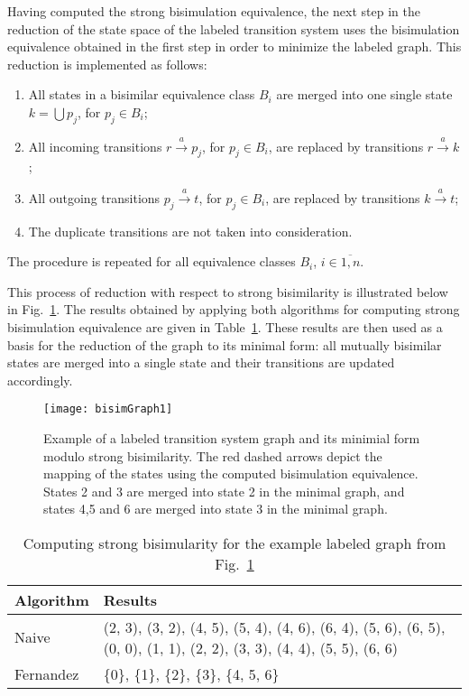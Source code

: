 Having computed the strong bisimulation equivalence, the next step in the reduction of the state space of the labeled transition system uses the bisimulation equivalence obtained in the first step in order to minimize the labeled graph. This reduction is implemented as follows:
\begin{enumerate}
	\item All states in a bisimilar equivalence class $B_{i}$ are merged into one single state $k=\bigcup p_{j}$, for $p_{j}\in B_{i}$;
	\item All incoming transitions $r \stackrel{a}{\rightarrow} p_{j}$, for $p_{j}\in B_{i}$, are replaced by transitions $r \stackrel{a}{\rightarrow} k$;
	\item All outgoing transitions $p_{j} \stackrel{a}{\rightarrow} t$, for $p_{j}\in B_{i}$, are replaced by transitions $k \stackrel{a}{\rightarrow} t$;
	\item The duplicate transitions are not taken into consideration.
\end{enumerate}
The procedure is repeated for all equivalence classes $B_{i}$, $i\in \overline{1,n}$.

This process of reduction with respect to strong bisimilarity is illustrated below in Fig.~\ref{fig:bisimGraph1}. The results obtained by applying both algorithms for computing strong bisimulation equivalence are given in Table~\ref{table1}. These results are then used as a basis for the reduction of the graph to its minimal form: all mutually bisimilar states are merged into a single state and their transitions are updated accordingly. 
\begin{figure}[h]
	\centering
	\texttt{[image: bisimGraph1]}
	\caption{Example of a labeled transition system graph and its minimial form modulo strong bisimilarity. The red dashed arrows depict the mapping of the states using the computed bisimulation equivalence. States 2 and 3 are merged into state 2 in the minimal graph, and states 4,5 and 6 are merged into state 3 in the minimal graph.}
	\label{fig:bisimGraph1}
\end{figure}

\begin{table}[h]
\begin{tabular}{| l | p{10.5cm}| }
  \hline                       
  Algorithm & Results \\ \hline
  Naive & (2, 3), (3, 2), (4, 5), 
(5, 4), (4, 6), (6, 4), (5, 6), (6, 5), (0, 0), (1, 1), (2, 2), (3, 3), (4, 4), (5, 5), (6, 6) \\ \hline
  Fernandez & \{0\}, \{1\}, \{2\}, \{3\}, \{4, 5, 6\} \\ \hline  
\end{tabular}
\\
\caption{Computing strong bisimularity for the example labeled graph from Fig.~\ref{fig:bisimGraph1}}
\label{table1}
\end{table}

